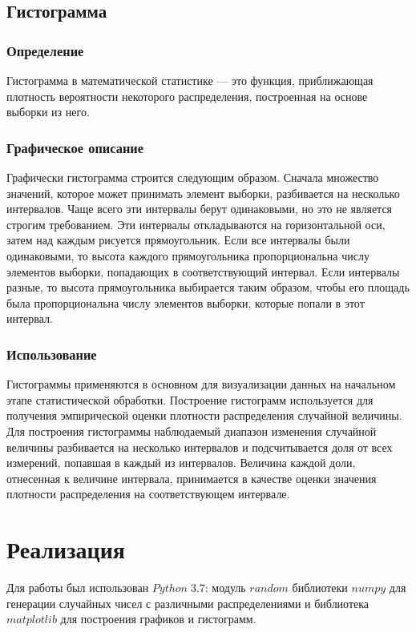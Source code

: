 \documentclass[a4]{article}
\begin{document}
		\subsection{Гистограмма}
			\subsubsection{Определение}
				Гистограмма в математической статистике — это функция, приближающая
				плотность вероятности некоторого распределения, построенная на основе
				выборки из него.

		
			\subsubsection{Графическое описание}
				Графически гистограмма строится следующим образом. Сначала множество значений, которое может принимать элемент выборки, разбивается на
				несколько интервалов. Чаще всего эти интервалы берут одинаковыми, но
				это не является строгим требованием. Эти интервалы откладываются на
				горизонтальной оси, затем над каждым рисуется прямоугольник. Если все
				интервалы были одинаковыми, то высота каждого прямоугольника пропорциональна числу элементов выборки, попадающих в соответствующий
				интервал. Если интервалы разные, то высота прямоугольника выбирается
				таким образом, чтобы его площадь была пропорциональна числу элементов
				выборки, которые попали в этот интервал.
			\subsubsection{Использование}
				Гистограммы применяются в основном для визуализации данных на начальном этапе статистической обработки.
				Построение гистограмм используется для получения эмпирической оценки
				плотности распределения случайной величины. Для построения гистограммы наблюдаемый диапазон изменения случайной величины разбивается на
				несколько интервалов и подсчитывается доля от всех измерений, попавшая
				в каждый из интервалов. Величина каждой доли, отнесенная к величине
				интервала, принимается в качестве оценки значения плотности распределения на соответствующем интервале.
				
	\section{Реализация}
	Для работы был использован $Python\;3.7$: модуль $random$ библиотеки $numpy$ для генерации случайных чисел с различными распределениями и библиотека $matplotlib$ для построения графиков и гистограмм.
\end{document}
